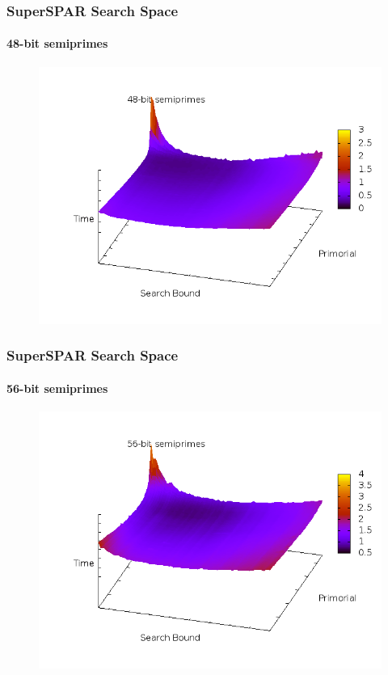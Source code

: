 \documentclass{beamer}
\begin{document}
\begin{frame}
\frametitle{SuperSPAR Search Space}
\framesubtitle{48-bit semiprimes}
\begin{figure}
\includegraphics[scale=0.47]{bits-48-3d.png}
\end{figure}
\end{frame}
\begin{frame}
\frametitle{SuperSPAR Search Space}
\framesubtitle{56-bit semiprimes}
\begin{figure}
\includegraphics[scale=0.47]{bits-56-3d.png}
\end{figure}
\end{frame}
\end{document}

